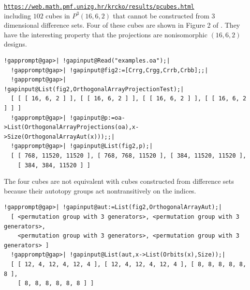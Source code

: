 \documentclass[a4paper,11pt]{report}
\begin{document}
{{ \href{https://web.math.pmf.unizg.hr/~krcko/results/pcubes.html} {\texttt{https://web.math.pmf.unizg.hr/\texttt{}krcko/results/pcubes.html}} \\
 including $102$ cubes in $P^3(16,6,2)$ that cannot be constructed from $3$\texttt{}dimensional difference sets. Four of these cubes are shown
in Figure 2 of \cite{KR24}. They have the interesting property that the projections are
non\texttt{}isomorphic $(16,6,2)$ designs. 
\begin{Verbatim}[commandchars=!@|,fontsize=\small,frame=single,label=Example]
  !gapprompt@gap>| !gapinput@Read("examples.oa");|
  !gapprompt@gap>| !gapinput@fig2:=[Crrg,Crgg,Crrb,Crbb];;|
  !gapprompt@gap>| !gapinput@List(fig2,OrthogonalArrayProjectionTest);|
  [ [ [ 16, 6, 2 ] ], [ [ 16, 6, 2 ] ], [ [ 16, 6, 2 ] ], [ [ 16, 6, 2 ] ] ]
  !gapprompt@gap>| !gapinput@p:=oa->List(OrthogonalArrayProjections(oa),x->Size(OrthogonalArrayAut(x)));;|
  !gapprompt@gap>| !gapinput@List(fig2,p);|
  [ [ 768, 11520, 11520 ], [ 768, 768, 11520 ], [ 384, 11520, 11520 ], 
    [ 384, 384, 11520 ] ]
\end{Verbatim}
 The four cubes are not equivalent with cubes constructed from difference sets
because their autotopy groups act non\texttt{}transitively on the
indices. 
\begin{Verbatim}[commandchars=!@|,fontsize=\small,frame=single,label=Example]
  !gapprompt@gap>| !gapinput@aut:=List(fig2,OrthogonalArrayAut);|
  [ <permutation group with 3 generators>, <permutation group with 3 generators>, 
    <permutation group with 3 generators>, <permutation group with 3 generators> ]
  !gapprompt@gap>| !gapinput@List(aut,x->List(Orbits(x),Size));|
  [ [ 12, 4, 12, 4, 12, 4 ], [ 12, 4, 12, 4, 12, 4 ], [ 8, 8, 8, 8, 8, 8 ], 
    [ 8, 8, 8, 8, 8, 8 ] ]
\end{Verbatim}
 }

 
}
\end{document}
